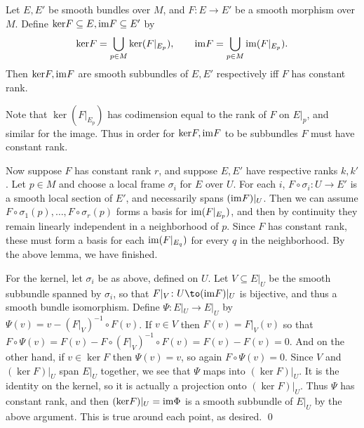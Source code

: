     Let $E,E'$ be smooth bundles over $M$, and $F\colon E\to E'$ be a smooth morphism over $M$.
    Define ${\rm ker} F\subseteq E,{\rm im} F\subseteq E'$ by
    $$ {\rm ker} F = \bigcup_{p\in M}{\rm ker}(F|_{E_p}),\qquad {\rm im} F = \bigcup_{p\in M}{\rm im}(F|_{E_p}) . $$
    Then ${\rm ker} F,{\rm im} F$ are smooth subbundles of $E,E'$ respectively iff $F$ has constant rank.

\ethrm

\bproof

    Note that $\ker(F|_{E_p})$ has codimension equal to the rank of $F$ on $E|_p$, and similar for the image.
    Thus in order for ${\rm ker} F,{\rm im} F$ to be subbundles $F$ must have constant rank.

    Now suppose $F$ has constant rank $r$, and suppose $E,E'$ have respective ranks $k,k'$.
    Let $p\in M$ and choose a local frame $\sigma_i$ for $E$ over $U$.
    For each $i$, $F\circ\sigma_i\colon U\to E'$ is a smooth local section of $E'$, and necessarily spans $({\rm im} F)|_U$.
    Then we can assume $F\circ\sigma_1(p),\dots,F\circ\sigma_r(p)$ forms a basis for ${\rm im}(F|_{E_p})$, and then by continuity they remain linearly
    independent in a neighborhood of $p$.
    Since $F$ has constant rank, these must form a basis for each ${\rm im}(F|_{E_q})$ for every $q$ in the neighborhood.
    By the above lemma, we have finished.

    For the kernel, let $\sigma_i$ be as above, defined on $U$.
    Let $V\subseteq E|_U$ be the smooth subbundle spanned by $\sigma_i$, so that $F|_V\colon U\to(\im F)|_U$ is bijective, and thus a smooth bundle isomorphism.
    Define $\Psi\colon E|_U\to E|_U$ by $\Psi(v)=v-(F|_V)^{-1}\circ F(v)$.
    If $v\in V$ then $F(v)=F|_V(v)$ so that $F\circ\Psi(v)=F(v)-F\circ(F|_V)^{-1}\circ F(v)=F(v)-F(v)=0$.
    And on the other hand, if $v\in\ker F$ then $\Psi(v)=v$, so again $F\circ\Psi(v)=0$.
    Since $V$ and $(\ker F)|_U$ span $E|_U$ together, we see that $\Psi$ maps into $(\ker F)|_U$.
    It is the identity on the kernel, so it is actually a projection onto $(\ker F)|_U$.
    Thus $\Psi$ has constant rank, and then $({\rm ker} F)|_U={\rm im}\Phi$ is a smooth subbundle of $E|_U$ by the above argument.
    This is true around each point, as desired.
    \qed

\eproof

